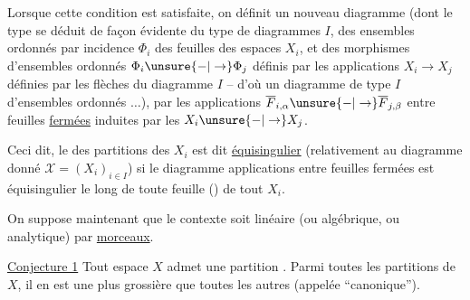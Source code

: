 Lorsque cette condition est satisfaite, on définit un nouveau diagramme (dont le type se déduit de façon évidente du type de diagrammes $I$, des ensembles ordonnés par incidence  $\Phi_i$ des feuilles des espaces $X_i$, et des morphismes d'ensembles ordonnés  $\Phi_i\unsure{-|\to}\Phi_j$ définis par les  applications $X_i\to X_j$ définies par les flèches du diagramme $I$ -- d'où un diagramme  de type $I$ d'ensembles ordonnés $\ldots$), par les applications $\overline F_{i,\alpha}\unsure{-|\to}\overline F_{j,\beta}$ entre feuilles \uline{fermées} induites par les $X_i\unsure{-|\to}X_j$.

Ceci dit, le  des partitions des $X_i$ est dit \uline{équisingulier} (relativement au diagramme donné $\mathcal X=(X_i)_{i\in I}$) si  le diagramme    applications entre feuilles fermées est équisingulier le long de toute feuille () de tout $X_i$.


On suppose maintenant que le contexte soit linéaire (ou algébrique, ou analytique) par \uline{morceaux}.

\uline{Conjecture 1} Tout espace $X$ admet une partition . Parmi toutes les partitions  de $X$, il en est une plus grossière que toutes les autres (appelée ``canonique'').
